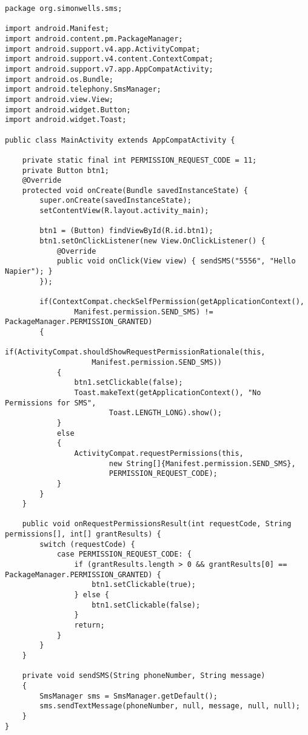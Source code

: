 \begin{lstlisting}
package org.simonwells.sms;

import android.Manifest;
import android.content.pm.PackageManager;
import android.support.v4.app.ActivityCompat;
import android.support.v4.content.ContextCompat;
import android.support.v7.app.AppCompatActivity;
import android.os.Bundle;
import android.telephony.SmsManager;
import android.view.View;
import android.widget.Button;
import android.widget.Toast;

public class MainActivity extends AppCompatActivity {

    private static final int PERMISSION_REQUEST_CODE = 11;
    private Button btn1;
    @Override
    protected void onCreate(Bundle savedInstanceState) {
        super.onCreate(savedInstanceState);
        setContentView(R.layout.activity_main);

        btn1 = (Button) findViewById(R.id.btn1);
        btn1.setOnClickListener(new View.OnClickListener() {
            @Override
            public void onClick(View view) { sendSMS("5556", "Hello Napier"); }
        });

        if(ContextCompat.checkSelfPermission(getApplicationContext(),
                Manifest.permission.SEND_SMS) != PackageManager.PERMISSION_GRANTED)
        {
            if(ActivityCompat.shouldShowRequestPermissionRationale(this,
                    Manifest.permission.SEND_SMS))
            {
                btn1.setClickable(false);
                Toast.makeText(getApplicationContext(), "No Permissions for SMS",
                        Toast.LENGTH_LONG).show();
            }
            else
            {
                ActivityCompat.requestPermissions(this,
                        new String[]{Manifest.permission.SEND_SMS},
                        PERMISSION_REQUEST_CODE);
            }
        }
    }

    public void onRequestPermissionsResult(int requestCode, String permissions[], int[] grantResults) {
        switch (requestCode) {
            case PERMISSION_REQUEST_CODE: {
                if (grantResults.length > 0 && grantResults[0] == PackageManager.PERMISSION_GRANTED) {
                    btn1.setClickable(true);
                } else {
                    btn1.setClickable(false);
                }
                return;
            }
        }
    }

    private void sendSMS(String phoneNumber, String message)
    {
        SmsManager sms = SmsManager.getDefault();
        sms.sendTextMessage(phoneNumber, null, message, null, null);
    }
}
\end{lstlisting}

